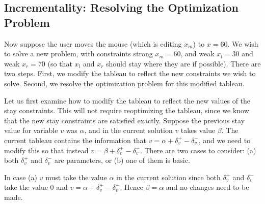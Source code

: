 \documentclass{uist96}
\newcommand{\strength}{\rm}
\newcommand{\ignore}[1]{}
\begin{document}
\ignore{ %
In general solving the optimization problem results in a tableau in 
basic feasible solved form
\begin{quote}\vspace*{-1ex}
minimize $e + \Sigma_{j=1}^m d_j y_j$ subject to
$$\begin{array}{rcl}
\bigwedge_{i=1}^{n} x_i = c_i + \Sigma_{j=i}^m a_{ij} y_j
\end{array}$$
\end{quote}\vspace{-0.9ex}
Each of the constants $c_i$ is non-negative.
Since the tableau represents an optimal solution, 
that minimizes the
objective function it must be the case 
that $d_j \geq 0$ for $1 \leq j \leq m$.
}


\subsection{Incrementality: Resolving the Optimization Problem}
\label{resolving}

Now suppose the user moves the mouse (which
is editing $x_m$) to $x=60$.
We wish to solve a new problem, with
constraints {\strength strong} $x_m = 60$, and
{\strength weak} $x_l = 30$ and {\strength weak} $x_r = 70$
(so that $x_l$ and $x_r$ should stay where they are if possible).
There are two steps.  First, we modify the tableau to reflect the new
constraints we wish to solve.  Second, we resolve the optimization problem
for this modified tableau.

Let us first examine how to modify the tableau to reflect the new values of
the stay constraints.  This will not require reoptimizing the tableau,
since we know that the new stay constraints are satisfied exactly.
Suppose the previous stay value for variable $v$ was $\alpha$, and in the
current solution $v$ takes value $\beta$\@.  The current tableau contains the
information that $v = \alpha + \delta_v^+ - \delta_v^-$, and we need to
modify this so that instead $v = \beta + \delta_v^+ - \delta_v^-$\@.  There
are two cases to consider: (a) both $\delta_v^+$ and $\delta_v^-$ are
parameters, or (b) one of them is basic.

In case (a) $v$ must take the value $\alpha$
in the current solution since both $\delta_v^+$ and 
$\delta_v^-$ take the value
$0$ and $v = \alpha + \delta_v^+ - \delta_v^-$\@.
Hence $\beta = \alpha$ and no changes need to be made.
\end{document}
